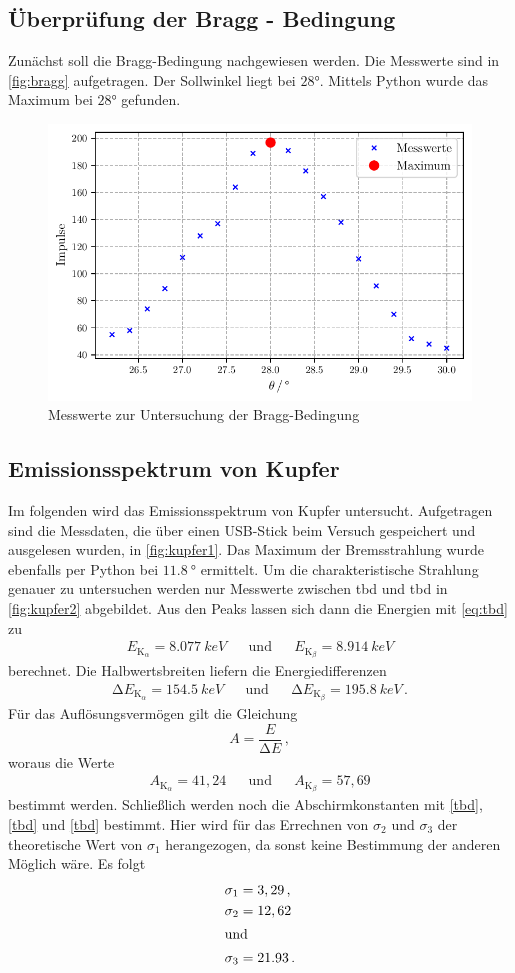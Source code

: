 \subsection{Überprüfung der Bragg - Bedingung}
Zunächst soll die Bragg-Bedingung nachgewiesen werden.
Die Messwerte sind in \autoref{fig:bragg} aufgetragen.
Der Sollwinkel liegt bei $28°$.
Mittels Python wurde das Maximum bei $28°$ gefunden.

\begin{figure}
  \centering
  \caption{Messwerte zur Untersuchung der Bragg-Bedingung}
  \label{fig:bragg}
  \includegraphics[width=0.5 \linewidth]{build/bragg.pdf}
\end{figure}

\subsection{Emissionsspektrum von Kupfer}
Im folgenden wird das Emissionsspektrum von Kupfer untersucht.
Aufgetragen sind die Messdaten, die über einen USB-Stick beim Versuch gespeichert und ausgelesen wurden, in \autoref{fig:kupfer1}.
Das Maximum der Bremsstrahlung wurde ebenfalls per Python bei $\qty{11.8}{°}$ ermittelt.  
Um die charakteristische Strahlung genauer zu untersuchen werden nur Messwerte zwischen tbd und tbd in \autoref{fig:kupfer2} abgebildet.
Aus den Peaks lassen sich dann die Energien mit \autoref{eq:tbd} zu
\begin{align*}
  E_{\text{K}_\alpha} = \qty{8.077}{keV} &&\text{und}&& E_{\text{K}_\beta} = \qty{8.914}{keV}
\end{align*}
berechnet.
Die Halbwertsbreiten liefern die Energiedifferenzen
\begin{align*}
  \increment E_{\text{K}_\alpha} = \qty{154.5}{keV} &&\text{und}&& \increment E_{\text{K}_\beta} = \qty{195.8}{keV} \, .
\end{align*}
Für das Auflösungsvermögen gilt die Gleichung
\begin{equation*}
  A = \frac{E}{\increment E} \, ,
\end{equation*}
woraus die Werte
\begin{align*}
  A_{\text{K}_\alpha} = 41,24 && \text{und} && A_{\text{K}_\beta} = 57,69
\end{align*}
bestimmt werden.
Schließlich werden noch die Abschirmkonstanten mit \autoref{tbd}, \autoref{tbd} und \autoref{tbd} bestimmt.
Hier wird für das Errechnen von $\sigma_2$ und $\sigma_3$ der theoretische Wert von $\sigma_1$ herangezogen, da sonst keine Bestimmung der anderen Möglich wäre. 
Es folgt
\begin{align*}
  \sigma_{1} &= 3,29 \, ,\\
  \sigma_{2} &= 12,62 \\ 
  \intertext{und}
  \sigma_{3} &= 21.93 \, .
\end{align*}

